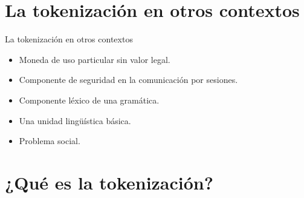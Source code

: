 \documentclass{beamer}
\begin{document}
  \section{La tokenización en otros contextos}

  \begin{frame}{La tokenización en otros contextos}
    \begin{itemize}
      \item Moneda de uso particular sin valor legal.
      \item Componente de seguridad en la comunicación por sesiones.
      \item Componente léxico de una gramática.
      \item Una unidad lingüística básica.
      \item Problema social.
    \end{itemize}
  \end{frame}

  \section{¿Qué es la tokenización?}
\end{document}
